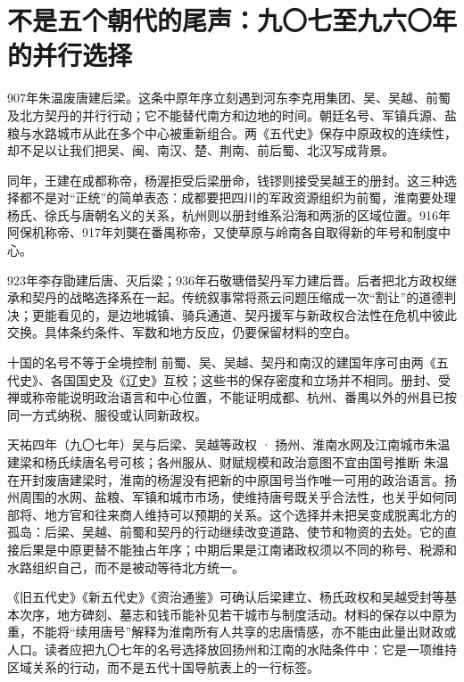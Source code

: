 \section{不是五个朝代的尾声：九〇七至九六〇年的并行选择}
\label{sec:five-dynasties-curated-chronicle}

907年朱温废唐建后梁。这条中原年序立刻遇到河东李克用集团、吴、吴越、前蜀及北方契丹的并行行动；它不能替代南方和边地的时间。朝廷名号、军镇兵源、盐粮与水路城市从此在多个中心被重新组合。两《五代史》保存中原政权的连续性，却不足以让我们把吴、闽、南汉、楚、荆南、前后蜀、北汉写成背景。

同年，王建在成都称帝，杨渥拒受后梁册命，钱镠则接受吴越王的册封。这三种选择都不是对“正统”的简单表态：成都要把四川的军政资源组织为前蜀，淮南要处理杨氏、徐氏与唐朝名义的关系，杭州则以册封维系沿海和两浙的区域位置。916年阿保机称帝、917年刘龑在番禺称帝，又使草原与岭南各自取得新的年号和制度中心。

923年李存勖建后唐、灭后梁；936年石敬瑭借契丹军力建后晋。后者把北方政权继承和契丹的战略选择系在一起。传统叙事常将燕云问题压缩成一次“割让”的道德判决；更能看见的，是边地城镇、骑兵通道、契丹援军与新政权合法性在危机中彼此交换。具体条约条件、军数和地方反应，仍要保留材料的空白。

\begin{sourcenote}{十国的名号不等于全境控制}
前蜀、吴、吴越、契丹和南汉的建国年序可由两《五代史》、各国国史及《辽史》互校；这些书的保存密度和立场并不相同。册封、受禅或称帝能说明政治语言和中心位置，不能证明成都、杭州、番禺以外的州县已按同一方式纳税、服役或认同新政权。
\end{sourcenote}

\begin{event}{}{天祐四年（九〇七年）}{吴与后梁、吴越等政权 · 扬州、淮南水网及江南城市}{朱温建梁和杨氏续唐名号可核；各州服从、财赋规模和政治意图不宜由国号推断}
朱温在开封废唐建梁时，淮南的杨渥没有把新的中原国号当作唯一可用的政治语言。扬州周围的水网、盐粮、军镇和城市市场，使维持唐号既关乎合法性，也关乎如何同部将、地方官和往来商人维持可以预期的关系。这个选择并未把吴变成脱离北方的孤岛：后梁、吴越、前蜀和契丹的行动继续改变道路、使节和物资的去处。它的直接后果是中原更替不能独占年序；中期后果是江南诸政权须以不同的称号、税源和水路组织自己，而不是被动等待北方统一。

《旧五代史》《新五代史》《资治通鉴》可确认后梁建立、杨氏政权和吴越受封等基本次序，地方碑刻、墓志和钱币能补见若干城市与制度活动。材料的保存以中原为重，不能将“续用唐号”解释为淮南所有人共享的忠唐情感，亦不能由此量出财政或人口。读者应把九〇七年的名号选择放回扬州和江南的水陆条件中：它是一项维持区域关系的行动，而不是五代十国导航表上的一行标签。
\end{event}

